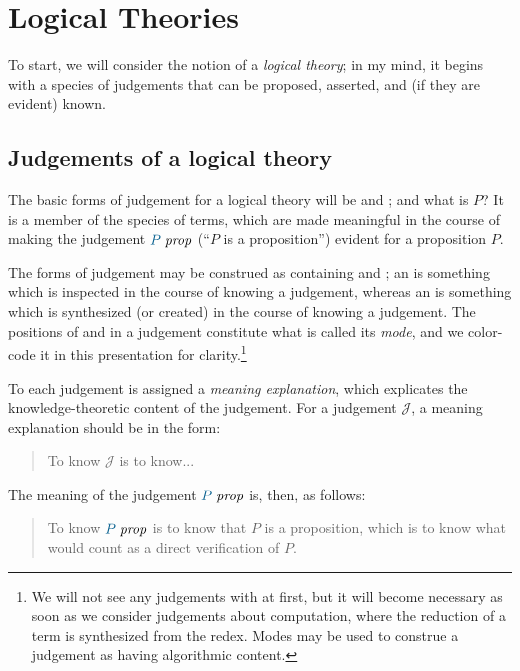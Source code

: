 \chapter{Logical Theories}

To start, we will consider the notion of a \emph{logical theory}; in
my mind, it begins with a species  of judgements that can be
proposed, asserted, and (if they are evident) known.

\section{Judgements of a logical theory}

The basic forms of judgement for a logical theory will be
 and ; and what is $P$?  It is a
member of the species of terms, which are made meaningful in the course of
making the judgement $\isprop{P}$ (``$P$ is a proposition'') evident for a
proposition $P$.

The forms of judgement may be construed as containing
 and ; an
 is something which is inspected in the course of
knowing a judgement, whereas an  is something which
is synthesized (or created) in the course of knowing a judgement. The positions
of  and  in a judgement
constitute what is called its \emph{mode}, and we color-code it in this
presentation for clarity.\footnote{We will not see any judgements with
   at first, but it will become necessary as soon
  as we consider judgements about computation, where the reduction of a term is
synthesized from the redex. Modes may be used to construe a judgement as having
algorithmic content.}

To each judgement is assigned a \emph{meaning explanation}, which explicates
the knowledge-theoretic content of the judgement. For a judgement
$\mathcal{J}$, a meaning explanation should be in the form:

\begin{quote}
  To know $\mathcal{J}$ is to know...
\end{quote}

The meaning of the judgement $\isprop{P}$ is, then, as follows:

\begin{quote}
  To know $\isprop{P}$ is to know that $P$ is a proposition, which is to know
  what would count as a direct verification of $P$.
\end{quote}

